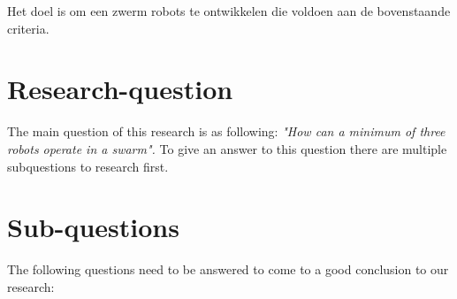 \documentclass[10pt,a4paper]{article}
\begin{document}
Het doel is om een zwerm robots te ontwikkelen die voldoen aan de bovenstaande criteria.

\section{Research-question}

The main question of this research is as following: \textit{"How can a minimum  of three robots operate in a swarm".} To give an answer to this question there are multiple subquestions to research first. 
 

\section{Sub-questions} 
The following questions need to be answered to come to a good conclusion to our research:
\end{document}
